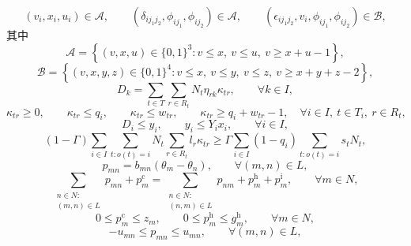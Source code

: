 \documentclass[11pt,a4paper]{article}
\begin{document}
\begin{equation}
(v_i,x_i,u_i) \in \mathcal A,
\qquad
(\delta_{ij_1 j_2},\phi_{ij_1},\phi_{ij_2}) \in \mathcal A,
\qquad
(\epsilon_{ij_1 j_2},v_i,\phi_{ij_1},\phi_{ij_2}) \in \mathcal B,
\tag{M12}
\end{equation}
其中
\begin{equation}
\mathcal A =
\left\{
(v,x,u) \in \{0,1\}^3 :
v \le x,\ v \le u,\ v \ge x+u-1
\right\},
\tag{M13}
\end{equation}
\begin{equation}
\mathcal B =
\left\{
(v,x,y,z) \in \{0,1\}^4 :
v \le x,\ v \le y,\ v \le z,\ v \ge x+y+z-2
\right\},
\tag{M14}
\end{equation}
\begin{equation}
D_k = \sum_{t \in T} \sum_{r \in R_t} N_t \eta_{rk} \kappa_{tr},
\qquad \forall k \in I,
\tag{M15}
\end{equation}
\begin{equation}
\kappa_{tr} \ge 0,\qquad
\kappa_{tr} \le q_i,\qquad
\kappa_{tr} \le w_{tr},\qquad
\kappa_{tr} \ge q_i + w_{tr} - 1,
\quad \forall i \in I,\ t \in T_i,\ r \in R_t,
\tag{M16}
\end{equation}
\begin{equation}
D_i \le y_i,
\qquad
y_i \le Y_i x_i,
\qquad \forall i \in I,
\tag{M17}
\end{equation}
\begin{equation}
(1-\Gamma)\sum_{i \in I}\sum_{t:o(t)=i} N_t \sum_{r \in R_t} l_r \kappa_{tr}
\ge
\Gamma \sum_{i \in I} (1-q_i)\sum_{t:o(t)=i} s_t N_t,
\tag{M18}
\end{equation}
\begin{equation}
p_{mn} = b_{mn}(\theta_m - \theta_n),
\qquad \forall (m,n) \in L,
\tag{M19}
\end{equation}
\begin{equation}
\sum_{\substack{n \in N:\\(m,n)\in L}} p_{mn} + p_m^{\mathrm c}
=
\sum_{\substack{n \in N:\\(n,m)\in L}} p_{nm} + p_m^{\mathrm h} + p_m^{\mathrm i},
\qquad \forall m \in N,
\tag{M20}
\end{equation}
\begin{equation}
0 \le p_m^{\mathrm c} \le z_m,
\qquad
0 \le p_m^{\mathrm h} \le g_m^{\mathrm h},
\qquad \forall m \in N,
\tag{M21}
\end{equation}
\begin{equation}
-u_{mn} \le p_{mn} \le u_{mn},
\qquad \forall (m,n) \in L,
\tag{M22}
\end{equation}
\end{document}
